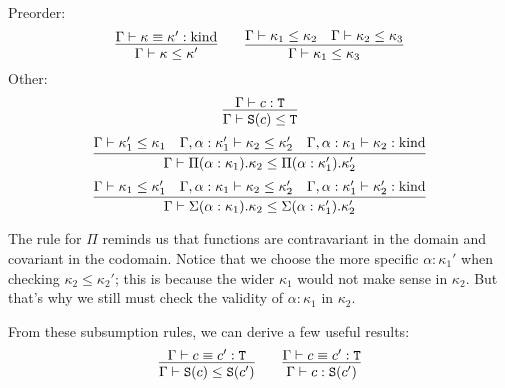 \begin{judgment}[Subkinding]\mbox{}\\
Preorder:
  \[
    \infer{\Gamma \vdash \kappa \le \kappa'}
      {\Gamma \vdash \kappa \equiv \kappa' : \kind}
    \qquad
    \infer{\Gamma \vdash \kappa_1 \le \kappa_3}
      {\Gamma \vdash \kappa_1 \le \kappa_2
      &\Gamma \vdash \kappa_2 \le \kappa_3
      }
  \]
Other:
  \[
    \infer{\Gamma \vdash \S(c) \le \T}{\Gamma \vdash c : \T}
  \]
  \[
    \infer
      {\Gamma \vdash \Pi(\alpha : \kappa_1).\kappa_2 \le \Pi(\alpha : \kappa_1') . \kappa_2'}
      {\Gamma \vdash \kappa_1' \le \kappa_1
      &\Gamma, \alpha : \kappa_1' \vdash \kappa_2 \le \kappa_2'
      &\Gamma, \alpha : \kappa_1 \vdash \kappa_2 : \kind
      }
  \]
  \[
    \infer
      {\Gamma \vdash \Sigma(\alpha : \kappa_1).\kappa_2 \le \Sigma(\alpha : \kappa_1').\kappa_2'}
      {\Gamma \vdash \kappa_1 \le \kappa_1'
      &\Gamma, \alpha : \kappa_1 \vdash \kappa_2 \le \kappa_2'
      &\Gamma, \alpha : \kappa_1' \vdash \kappa_2' : \kind
      }
  \]
\end{judgment}
The rule for $\Pi$ reminds us that functions are contravariant in the domain and
covariant in the codomain. Notice that we choose the more specific $\alpha : \kappa_1'$
when checking $\kappa_2 \le \kappa_2'$; this is because the wider $\kappa_1$ would not make sense
in $\kappa_2$. But that's why we still must check the validity of $\alpha : \kappa_1$
in $\kappa_2$.

From these subsumption rules, we can derive a few useful results:
\[
  \infer
    {\Gamma \vdash \S(c) \le \S(c')}
    {\Gamma \vdash c \equiv c' : \T}
  \qquad
  \infer
    {\Gamma \vdash c : \S(c')}
    {\Gamma \vdash c \equiv c' : \T}
\]

